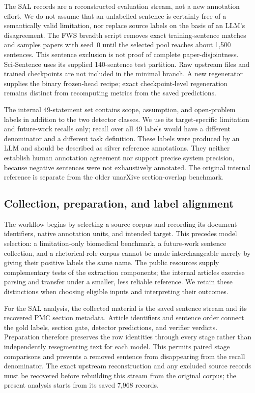 The SAL records are a reconstructed evaluation stream, not a new annotation effort. We do not
assume that an unlabelled sentence is certainly free of a semantically valid limitation, nor
replace source labels on the basis of an LLM's disagreement. The FWS breadth script removes exact
training-sentence matches and samples papers with seed~0 until the selected pool reaches about
1,500 sentences. This sentence exclusion is not proof of complete paper-disjointness.
Sci-Sentence uses its supplied 140-sentence test partition. Raw upstream files and trained checkpoints are not included in the minimal branch. A
new regenerator supplies the binary frozen-head recipe; exact checkpoint-level regeneration
remains distinct from recomputing metrics from the saved predictions.

The internal 49-statement set contains scope, assumption, and open-problem labels in addition to
the two detector classes. We use its target-specific limitation and future-work recalls only;
recall over all 49 labels would have a different denominator and a different task definition.
These labels were produced by an LLM and should be described as silver reference annotations.
They neither establish human annotation agreement nor support precise system precision, because
negative sentences were not exhaustively annotated. The original internal reference is separate
from the older unarXive section-overlap benchmark.

\subsection{Collection, preparation, and label alignment}
\label{S:preparation}

The workflow begins by selecting a source corpus and recording its document identifiers, native
annotation units, and intended target. This precedes model selection: a limitation-only biomedical
benchmark, a future-work sentence collection, and a rhetorical-role corpus cannot be made
interchangeable merely by giving their positive labels the same name. The public resources
supply complementary tests of the extraction components; the internal articles exercise parsing
and transfer under a smaller, less reliable reference. We retain these distinctions when choosing
eligible inputs and interpreting their outcomes.

For the SAL analysis, the collected material is the saved sentence stream and its recovered
PMC section metadata. Article identifiers and sentence order connect the gold labels, section gate,
detector predictions, and verifier verdicts. Preparation therefore preserves the row identities
through every stage rather than independently resegmenting text for each model. This permits
paired stage comparisons and prevents a removed sentence from disappearing from the recall
denominator. The exact upstream reconstruction and any excluded source records must be recovered
before rebuilding this stream from the original corpus; the present analysis starts from its
saved 7,968 records.

